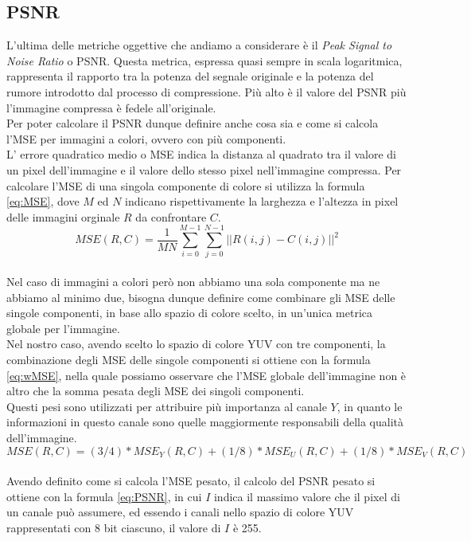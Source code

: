 \subsection{PSNR}
L’ultima delle metriche oggettive che andiamo a considerare è il \textit{Peak Signal to Noise Ratio} o PSNR. Questa metrica, espressa quasi sempre in scala logaritmica, rappresenta il rapporto tra la potenza del segnale originale e la potenza del rumore introdotto dal processo di compressione. Più alto è il valore del PSNR più l’immagine compressa è fedele all’originale.\\
Per poter calcolare il PSNR dunque definire anche cosa sia e come si calcola l’MSE per immagini a colori, ovvero con più componenti.\\
L’ errore quadratico medio o MSE indica la distanza al quadrato tra il valore di un pixel dell’immagine e il valore dello stesso pixel nell’immagine compressa. Per calcolare l’MSE di una singola componente di colore si utilizza la formula \ref{eq:MSE}, dove $M$ ed $N$ indicano rispettivamente la larghezza e l'altezza in pixel delle immagini orginale $R$ da confrontare $C$.\\
\begin{equation}\label{eq:MSE}
    MSE(R,C) = \dfrac{1}{MN} \sum_{i=0}^{M-1} \sum_{j=0}^{N-1} || R(i,j) - C(i,j) ||^{2}
\end{equation}\\
Nel caso di immagini a colori però non abbiamo una sola componente ma ne abbiamo al minimo due, bisogna dunque definire come combinare gli MSE delle singole componenti, in base allo spazio di colore scelto, in un’unica metrica globale per l’immagine.\\
Nel nostro caso, avendo scelto lo spazio di colore YUV con tre componenti, la combinazione degli MSE delle singole componenti si ottiene con la formula \ref{eq:wMSE}, nella quale possiamo osservare che l’MSE globale dell’immagine non è altro che la somma pesata degli MSE dei singoli componenti.\\
Questi pesi sono utilizzati per attribuire più importanza al canale $Y$, in quanto le informazioni in questo canale sono quelle maggiormente responsabili della qualità dell’immagine.\\
\begin{equation}\label{eq:wMSE}
    MSE(R,C) = (3/4) * MSE_{Y}(R,C) + (1/8) * MSE_{U}(R,C)  +  (1/8) * MSE_{V}(R,C)
\end{equation}\\
Avendo definito come si calcola l’MSE pesato, il calcolo del PSNR pesato si ottiene con la formula \ref{eq:PSNR}, in cui $I$ indica il massimo valore che il pixel di un canale può assumere, ed essendo i canali nello spazio di colore YUV rappresentati con 8 bit ciascuno, il valore di $I$ è 255.\\
